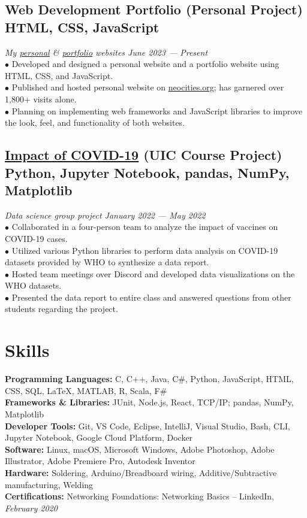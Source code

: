 \documentclass{article}
\begin{document}
\subsection{Web Development Portfolio (Personal Project) \hfill \textnormal{HTML, CSS, JavaScript}}
\vspace{-0.5em}
\textit{My \href{https://github.com/IanLulu/neocities-website}{\underline{personal}} \& \href{https://github.com/IanLulu/ianlulu.github.io}{\underline{portfolio}} websites \hfill June 2023 --- Present}
\\
$\bullet$ Developed and designed a personal website and a portfolio website using HTML, CSS, and JavaScript.
\\
$\bullet$ Published and hosted personal website on \url{neocities.org}; has garnered over 1,800+ visits alone.
\\
$\bullet$ Planning on implementing web frameworks and JavaScript libraries to improve the look, feel, and functionality of both websites.
\vspace{-0.5em}

\subsection{\href{https://github.com/uic-cs418/cs418-spring22-the-wild-card}{\underline{Impact of COVID-19}} (UIC Course Project) \hfill \textnormal{Python, Jupyter Notebook, pandas, NumPy, Matplotlib}}
\vspace{-0.5em}
\textit{Data science group project \hfill January 2022 --- May 2022}
\\
$\bullet$ Collaborated in a four-person team to analyze the impact of vaccines on COVID-19 cases.
\\
$\bullet$ Utilized various Python libraries to perform data analysis on COVID-19 datasets provided by WHO to synthesize a data report.
\\
$\bullet$ Hosted team meetings over Discord and developed data visualizations on the WHO datasets.
\\
$\bullet$ Presented the data report to entire class and answered questions from other students regarding the project.


\section{Skills}
\textbf{Programming Languages:} C, C++, Java, C\#, Python, JavaScript, HTML, CSS, SQL, {\LaTeX}, MATLAB, R, Scala, F\#
\\
\textbf{Frameworks \& Libraries:} JUnit, Node.js, React, TCP/IP; pandas, NumPy, Matplotlib
\\
\textbf{Developer Tools:} Git, VS Code, Eclipse, IntelliJ, Visual Studio, Bash, CLI, Jupyter Notebook, Google Cloud Platform, Docker
\\
\textbf{Software:} Linux, macOS, Microsoft Windows, Adobe Photoshop, Adobe Illustrator, Adobe Premiere Pro, Autodesk Inventor
\\
\textbf{Hardware:} Soldering, Arduino/Breadboard wiring, Additive/Subtractive manufacturing, Welding
\\
\textbf{Certifications:} Networking Foundations: Networking Basics -- LinkedIn, \textit{February 2020}
\end{document}
